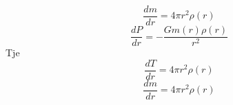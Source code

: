 \begin{equation}
    \frac{dm}{dr} = 4\pi r^2 \rho(r)
\end{equation}
\begin{equation}
    \frac{dP}{dr} = -\frac{G m(r)\rho(r)}{r^2}
\end{equation}
Tje
\begin{equation}
    \frac{dT}{dr} = 4\pi r^2 \rho(r)
\end{equation}
\begin{equation}
    \frac{dm}{dr} = 4\pi r^2 \rho(r)
\end{equation}